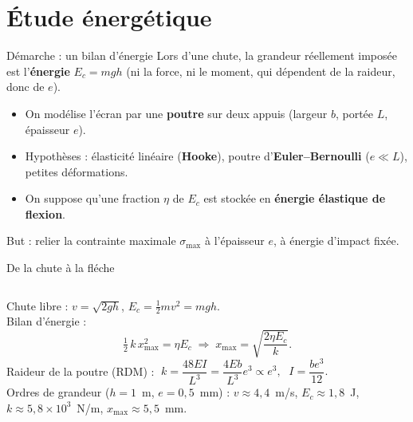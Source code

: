 \documentclass[11pt,aspectratio=169]{beamer}
\begin{document}
\section{Étude énergétique}

\begin{frame}{Démarche : un bilan d'énergie}
  \footnotesize
  Lors d'une chute, la grandeur réellement imposée est l'\textbf{énergie}
  $E_c=mgh$ (ni la force, ni le moment, qui dépendent de la raideur, donc de $e$).
  \medskip
  \begin{itemize}\itemsep3pt
    \item On modélise l'écran par une \textbf{poutre} sur deux appuis (largeur
          $b$, portée $L$, épaisseur $e$).
    \item Hypothèses : élasticité linéaire (\textbf{Hooke}), poutre
          d'\textbf{Euler--Bernoulli} ($e\ll L$), petites déformations.
    \item On suppose qu'une fraction $\eta$ de $E_c$ est stockée en
          \textbf{énergie élastique de flexion}.
  \end{itemize}
  \medskip
  \centering\textcolor{verre}{But : relier la contrainte maximale $\sigma_{\max}$
  à l'épaisseur $e$, à énergie d'impact fixée.}
\end{frame}

\begin{frame}{De la chute à la fléche}
  \begin{columns}[c]
    \centering
    \footnotesize
    Chute libre : $v=\sqrt{2gh}$, $E_c=\tfrac12 mv^{2}=mgh$.
    \medskip\\
    Bilan d'énergie :
    \[ \tfrac12\,k\,x_{\max}^{2}=\eta E_c
       \;\Rightarrow\; x_{\max}=\sqrt{\frac{2\eta E_c}{k}} . \]
    Raideur de la poutre (RDM) : $\;k=\dfrac{48EI}{L^{3}}=\dfrac{4Eb}{L^{3}}e^{3}\propto e^{3},\;$
    $I=\dfrac{be^{3}}{12}.$
    \medskip\\
    \scriptsize Ordres de grandeur ($h=1$~m, $e=0{,}5$~mm) :
    $v\approx 4{,}4$~m/s, $E_c\approx 1{,}8$~J, $k\approx 5{,}8\times10^{3}$~N/m,
    $x_{\max}\approx 5{,}5$~mm.
  \end{columns}
\end{frame}
\end{document}
